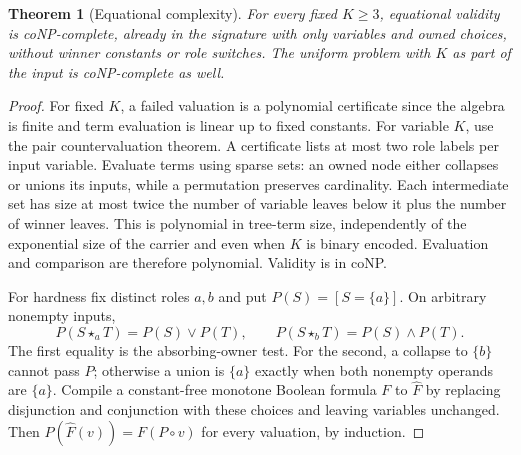 \documentclass[11pt]{article}
\newtheorem{theorem}{Theorem}[section]
\newcommand{\ow}[1]{\mathbin{\star_{#1}}}
\begin{document}
\begin{theorem}[Equational complexity]\label{thm:complexity}
For every fixed $K\geq3$, equational validity is coNP-complete, already
in the signature with only variables and owned choices, without winner
constants or role switches. The uniform problem with $K$
as part of the input is coNP-complete as well.
\end{theorem}
\begin{proof}
For fixed $K$, a failed valuation is a polynomial certificate since the
algebra is finite and term evaluation is linear up to fixed constants.
For variable $K$, use the pair countervaluation theorem. A certificate
lists at most two role labels per input variable. Evaluate terms using
sparse sets: an owned node either collapses or unions its inputs, while
a permutation preserves cardinality. Each intermediate set has size at
most twice the number of variable leaves below it plus the number of
winner leaves. This is polynomial in tree-term size, independently of
the exponential size of the carrier and even when $K$ is binary encoded.
Evaluation and comparison are therefore polynomial. Validity is in coNP.

For hardness fix distinct roles $a,b$ and put $P(S)=[S=\{a\}]$.
On arbitrary nonempty inputs,
\[
 P(S\ow a T)=P(S)\lor P(T),\qquad
 P(S\ow b T)=P(S)\land P(T).
\]
The first equality is the absorbing-owner test. For the second, a
collapse to $\{b\}$ cannot pass $P$; otherwise a union is $\{a\}$ exactly
when both nonempty operands are $\{a\}$. Compile a constant-free monotone
Boolean formula $F$ to $\widehat F$ by replacing disjunction and
conjunction with these choices and leaving variables unchanged.
Then $P(\widehat F(v))=F(P\circ v)$ for every valuation, by induction.


\end{proof}
\end{document}
